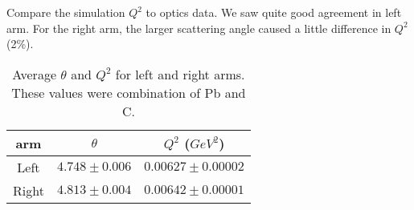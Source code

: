 \begin{comment}
I am doubting if I was comparing the same thing. 
In data, $Q^2$ was calculated as:
$$ Q^2 = 2*beamE*P*(1-\cos(\theta))$$
where beamE was the average beam energy (before hitting the target), 
and P was the reconstructed beam energy, or post-target energy 
and $\theta$ was the reconstructed scattering angle 

But in simulation, $Q^2$ was calculated as:
$$ Q^2 = 2*E*Ef*(1-\cos(\theta)) $$
where E was the post vertex beam energy: I made a mistake here, E should be 
pre vertex beam energy.
$$ Ef = M*E/(M + E*(1-cos(th))) $$
was the theorectical beam energy after elastic scattering and $\theta$ was 
the scattering angle.

Obviously, data and simulation had different definitions:
$$ beamE > E	\quad P < E	\quad P \stacker{?}{\sim} $$
The only good news was that beamE, E, P, Ef were all close to each other. Overall,
the simulation would make the simulation $Q^2$ smaller than that of data. Not
sure how large the uncertainty was.

The only difference here for vertex and post-vertex was the scattering angle,
one was the vertex angle and the other being the post-target scattering angle.

The CREX analysis was comparing the same thing.
\end{comment}

Compare the simulation $Q^2$ to optics data. We saw quite good agreement in left
arm. For the right arm, the larger scattering angle caused a little difference
in $Q^2$ (2\%).
\begin{table}
    \centering
    \begin{tabular}{c | c c}
	\hline
	arm & $\theta$	& $Q^2$ ($GeV^2$)   \\
	\hline
	Left	& $4.748 \pm 0.006$ & $0.00627 \pm 0.00002$	\\
	Right	& $4.813 \pm 0.004$ & $0.00642 \pm 0.00001$	\\
	\hline
    \end{tabular}
    \caption{Average $\theta$ and $Q^2$ for left and right arms. These values were
    combination of Pb and C.}
    \label{tab:prex_C_contam_Q2}
\end{table}

